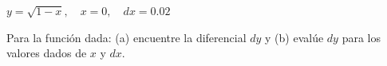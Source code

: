 \item $y = \sqrt{1 - x}, \quad x = 0, \quad dx = 0.02$
\par
Para la función dada: (a) encuentre la diferencial $dy$ y (b) evalúe $dy$ para los valores dados de $x$ y $dx$.
